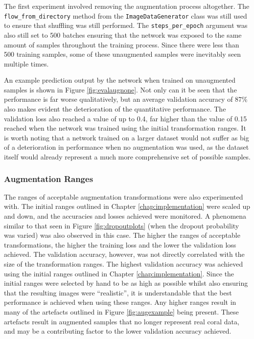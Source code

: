The first experiment involved removing the augmentation process altogether. The \texttt{flow\_from\_directory} method from the \texttt{ImageDataGenerator} class was still used to ensure that shuffling was still performed. The \texttt{steps\_per\_epoch} argument was also still set to 500 batches ensuring that the network was exposed to the same amount of samples throughout the training process. Since there were less than 500 training samples, some of these unaugmented samples were inevitably seen multiple times.

An example prediction output by the network when trained on unaugmented samples is shown in Figure \ref{fig:evalaugnone}. Not only can it be seen that the performance is far worse qualitatively, but an average validation accuracy of 87\% also makes evident the deterioration of the quantitative performance. The validation loss also reached a value of up to 0.4, far higher than the value of 0.15 reached when the network was trained using the initial transformation ranges. It is worth noting that a network trained on a larger dataset would not suffer as big of a deterioration in performance when no augmentation was used, as the dataset itself would already represent a much more comprehensive set of possible samples.

\subsubsection{Augmentation Ranges}

The ranges of acceptable augmentation transformations were also experimented with. The initial ranges outlined in Chapter \ref{chap:implementation} were scaled up and down, and the accuracies and losses achieved were monitored. A phenomena similar to that seen in Figure \ref{fig:dropoutplots} (when the dropout probability was varied) was also observed in this case. The higher the ranges of acceptable transformations, the higher the training loss and the lower the validation loss achieved. The validation accuracy, however, was not directly correlated with the size of the transformation ranges. The highest validation accuracy was achieved using the initial ranges outlined in Chapter \ref{chap:implementation}. Since the initial ranges were selected by hand to be as high as possible whilst also ensuring that the resulting images were ``realistic'', it is understandable that the best performance is achieved when using these ranges. Any higher ranges result in many of the artefacts outlined in Figure \ref{fig:augexample} being present. These artefacts result in augmented samples that no longer represent real coral data, and may be a contributing factor to the lower validation accuracy achieved.

